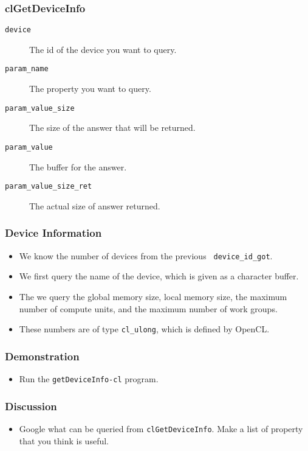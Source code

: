 \documentclass{beamer}
\begin{document}
\begin{frame}
\end{frame}

\begin{frame}
  \frametitle{clGetDeviceInfo}
  \begin{description}
  \item [\tt device] The id of the device you want to query.
  \item [\tt param\_name] The property you want to query.
  \item [\tt param\_value\_size] The size of the answer that will be
    returned.
  \item [\tt param\_value] The buffer for the answer.
  \item [\tt param\_value\_size\_ret] The actual size of answer returned.
  \end{description}
\end{frame}

\begin{frame}
\end{frame}

\begin{frame}
  \frametitle{Device Information}
  \begin{itemize}
  \item We know the number of devices from the previous {\tt
    device\_id\_got}.
  \item We first query the name of the device, which is given as a
    character buffer.
  \item The we query the global memory size, local memory size, the
    maximum number of compute units, and the maximum number of
    work groups.
  \item These numbers are of type {\tt cl\_ulong}, which is defined by
    OpenCL.
  \end{itemize}
\end{frame}

\begin{frame}
  \frametitle{Demonstration}
  \begin{itemize}
  \item Run the {\tt getDeviceInfo-cl} program.
  \end{itemize}
\end{frame}

\begin{frame}
  \frametitle{Discussion}
  \begin{itemize}
  \item Google what can be queried from {\tt clGetDeviceInfo}.  Make a
    list of property that you think is useful.
  \end{itemize}
\end{frame}
\end{document}
